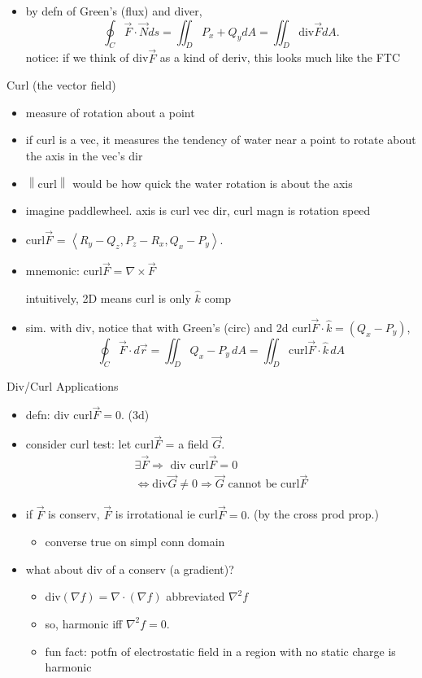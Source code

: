 \documentclass[11pt]{article}
\theoremstyle{definition}
\newcommand{\col}[1]{\begin{minipage}{\columnwidth}#1\end{minipage}}
\newcommand{\magn}[1]{\left\lVert #1 \right\rVert}
\begin{document}
\begin{multicols}{2}
{\begin{itemize}
      converse is true on simply connected $\vec{F}$.
      \item by defn of Green's (flux) and diver,
      \[\oint_C \vec{F}\cdot\vec{N}ds = \iint_D P_x+Q_ydA=\iint_D \text{div}\vec{F}dA.\]
      notice: if we think of div$\vec{F}$ as a kind of deriv, this looks much like the FTC
    \end{itemize}
  }
  \col{
    Curl (the vector field)
    \begin{itemize}
      \item measure of rotation about a point
      \item if curl is a vec, it measures the tendency of water near a point to rotate about the axis in the vec's dir
      \item $\magn{\text{curl}}$ would be how quick the water rotation is about the axis
      \item imagine paddlewheel. axis is curl vec dir, curl magn is rotation speed
      \item \raggedright curl$\vec{F}$ = $\left<R_y-Q_z,P_z-R_x,Q_x-P_y\right>$.
      \item mnemonic: curl$\vec{F}=\nabla\times\vec{F}$
      
      intuitively, 2D means curl is only $\hat{k}$ comp
      \item sim. with div, notice that with Green's (circ) and 2d curl$\vec{F}\cdot\hat{k} = (Q_x-P_y)$,
      \[\oint_C \vec{F}\cdot d\vec{r} = \iint_D Q_x-P_y \,dA = \iint_D \text{curl}\vec{F}\cdot\hat{k}\,dA\]
    \end{itemize}
    Div/Curl Applications
    \begin{itemize}
      \item defn: div curl$\vec{F} = 0$. (3d)
      \item consider curl test: let curl$\vec{F}$ = a field $\vec{G}$.
      \begin{gather*}
        \exists \vec{F}\Rightarrow\text{ div curl}\vec{F} = 0 \\
        \iff \text{div}\vec{G}\ne 0 \Rightarrow\vec{G} \text{ cannot be curl}\vec{F}
      \end{gather*}
      \item if $\vec{F}$ is conserv, $\vec{F}$ is irrotational ie curl$\vec{F}=0$. (by the cross prod prop.)
      \begin{itemize}
        \item converse true on simpl conn domain
      \end{itemize}
      \item what about div of a conserv (a gradient)?
      \begin{itemize}
        \item div$(\nabla f) = \nabla\cdot(\nabla f)$ abbreviated $\nabla^2 f$
        \item so, harmonic iff $\nabla ^2 f = 0$.
        \item fun fact: potfn of electrostatic field in a region with no static charge is harmonic
      \end{itemize}
    \end{itemize}
  }
\end{multicols}
\end{document}
